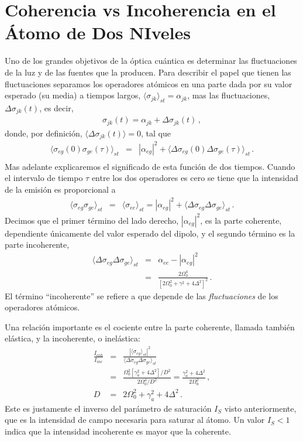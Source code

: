 \documentclass[12pt]{report}
\providecommand{\vxp}[1]{\langle #1 \rangle}
\begin{document}
\section{Coherencia vs Incoherencia en el \'Atomo de Dos NIveles} 
Uno de los grandes objetivos de la \'optica cu\'antica es determinar las 
fluctuaciones de la luz y de las fuentes que la producen. Para describir el 
papel que tienen las fluctuaciones separamos los operadores at\'omicos 
en una parte dada por su valor esperado (su media) a tiempos largos, 
$ \vxp{\sigma_{jk}}_{st} =\alpha_{jk}$, mas 
las fluctuaciones, $\Delta \sigma_{jk}(t)$, es decir,  
%
\begin{eqnarray} 	\label{eq:dipoleSplit}
\sigma_{jk} (t) =\alpha_{jk}  +\Delta \sigma_{jk} (t) 	\,, 
\end{eqnarray}
donde, por definici\'on, $\vxp{\Delta \sigma_{jk}(t)} =0$,  tal que 
%
\begin{eqnarray}
\vxp{\sigma_{eg} (0) \sigma_{ge} (\tau)}_{st}  
&=& |\alpha_{eg} |^2 
	+\vxp{\Delta \sigma_{eg} (0) \Delta \sigma_{ge} (\tau)}_{st} \,.
	\nonumber \\
\end{eqnarray}
Mas adelante explicaremos el significado de esta funci\'on de dos tiempos. 
Cuando el intervalo de tiempo $\tau$ entre los dos operadores es cero 
se tiene que la intensidad de la emisi\'on es proporcional a
%
\begin{eqnarray} 
\vxp{\sigma_{eg} \sigma_{ge}}_{st} 
	&=& \vxp{\sigma_{ee}}_{st} = |\alpha_{eg} |^2   
	+\vxp{\Delta \sigma_{eg} \Delta \sigma_{ge}}_{st}  \,. 
\end{eqnarray}
Decimos que el primer t\'ermino del lado derecho, $|\alpha_{eg} |^2$, 
es la parte coherente, dependiente \'unicamente del valor esperado del 
dipolo, y el segundo t\'ermino es la parte incoherente, 
%
\begin{eqnarray} 
\vxp{\Delta \sigma_{eg} \Delta \sigma_{ge}}_{st} 
	&=& \alpha_{ee} -|\alpha_{eg}|^2 		 \\  
	&=& \frac{ 2\Omega_0^4}
   	 { [ 2\Omega_0^2 +\gamma^2 +4\Delta^2 ]^2} \,.   \nonumber 
\end{eqnarray}
El t\'ermino ``incoherente'' se refiere a que depende de las 
\textit{fluctuaciones}  de los operadores at\'omicos.

Una relaci\'on importante es el cociente entre la parte coherente, llamada 
tambi\'en el\'astica, y la incoherente, o inel\'astica: 
%
\begin{eqnarray}  
\frac{I_{coh}}{I_{inc}} &=& \frac{|\vxp{\sigma_{eg}}_{st}|^2}
	{\vxp{\Delta \sigma_{eg} \Delta \sigma_{ge}}_{st}}		\\ 
&=& \frac{ \Omega_0^2 [\gamma_a^2 +4\Delta^2]/D^2 }
	{ 2 \Omega_0^4 /D^2} 
	= \frac{ \gamma_a^2 +4\Delta^2 }{ 2 \Omega_0^2} \,, \nonumber \\ 
D &=& 2\Omega_0^2 +\gamma_a^2 +4\Delta^2 \,.
\end{eqnarray}
Este es justamente el inverso del par\'ametro de saturaci\'on $I_S$ visto 
anteriormente, que es la intensidad de campo necesaria para saturar al 
\'atomo. Un valor $I_S <1$ indica que la intensidad incoherente es mayor 
que la coherente. 
\end{document}

